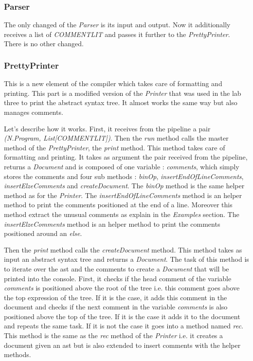 \subsubsection{Parser}
The only changed of the \emph{Parser} is its input and output. Now it additionally receives a list of \emph{COMMENTLIT} and passes it further to the \emph{PrettyPrinter}. There is no other changed.

\subsubsection{PrettyPrinter}
This is a new element of the compiler which takes care of formatting and printing. This part is a modified version of the \emph{Printer} that was used in the lab three to print the abstract syntax tree. It almost works the same way but also manages comments.

Let's describe how it works. First, it receives from the pipeline a pair \emph{(N.Program, List[COMMENTLIT])}. Then the \emph{run} method calls the master method of the \emph{PrettyPrinter}, the \emph{print} method. This method takes care of formatting and printing. It takes as argument the pair received from the pipeline, returns a \emph{Document} and is composed of one variable : \emph{comments}, which simply stores the comments and four sub methods : \emph{binOp}, \emph{insertEndOfLineComments}, \emph{insertElzeComments} and \emph{createDocument}. The \emph{binOp} method is the same helper method as for the \emph{Printer}. The \emph{insertEndOfLineComments} method is an helper method to print the comments positioned at the end of a line. Moreover this method extract the unusual comments as explain in the \emph{Examples} section. The \emph{insertElzeComments} method is an helper method to print the comments positioned around an \emph{else}.

Then the \emph{print} method calls the \emph{createDocument} method. This method takes as input an abstract syntax tree and returns a \emph{Document}. The task of this method is to iterate over the ast and the comments to create a \emph{Document} that will be printed into the console. First, it checks if the head comment of the variable \emph{comments} is positioned above the root of the tree i.e. this comment goes above the top expression of the tree. If it is the case, it adds this comment in the document and checks if the next comment in the variable \emph{comments} is also positioned above the top of the tree. If it is the case it adds it to the document and repeats the same task. If it is not the case it goes into a method named \emph{rec}. This method is the same as the \emph{rec} method of the \emph{Printer} i.e. it creates a document given an ast but is also extended to insert comments with the helper methods. 

